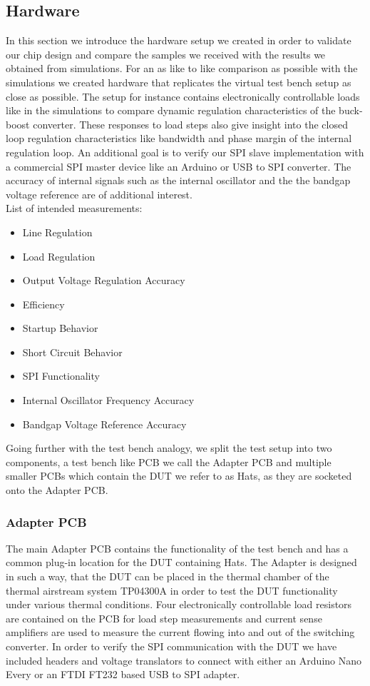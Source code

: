\subsection{Hardware}
In this section we introduce the hardware setup we created in order to validate our chip design and compare the samples we received with the results we obtained from simulations. For an as like to like comparison as possible with the simulations we created hardware that replicates the virtual test bench setup as close as possible. The setup for instance contains electronically controllable loads like in the simulations to compare dynamic regulation characteristics of the buck-boost converter. These responses to load steps also give insight into the closed loop regulation characteristics like bandwidth and phase margin of the internal regulation loop. An additional goal is to verify our SPI slave implementation with a commercial SPI master device like an Arduino or USB to SPI converter. The accuracy of internal signals such as the internal oscillator and the the bandgap voltage reference are of additional interest. \\
List of intended measurements:
\begin{itemize}
    \item Line Regulation
    \item Load Regulation
    \item Output Voltage Regulation Accuracy 
    \item Efficiency
    \item Startup Behavior
    \item Short Circuit Behavior
    \item SPI Functionality
    \item Internal Oscillator Frequency Accuracy
    \item Bandgap Voltage Reference Accuracy
\end{itemize}

Going further with the test bench analogy, we split the test setup into two components, a test bench like PCB we call the Adapter PCB and multiple smaller PCBs which contain the \ac{DUT} we refer to as Hats, as they are socketed onto the Adapter PCB.


\subsubsection{Adapter PCB}
The main Adapter PCB contains the functionality of the test bench and has a common plug-in location for the \ac{DUT} containing Hats. The Adapter is designed in such a way, that the \ac{DUT} can be placed in the thermal chamber of the thermal airstream system TP04300A in order to test the \ac{DUT} functionality under various thermal conditions. Four electronically controllable load resistors are contained on the PCB for load step measurements and current sense amplifiers are used to measure the current flowing into and out of the switching converter. In order to verify the SPI communication with the \ac{DUT} we have included headers and voltage translators to connect with either an Arduino Nano Every or an FTDI FT232 based USB to SPI adapter.

